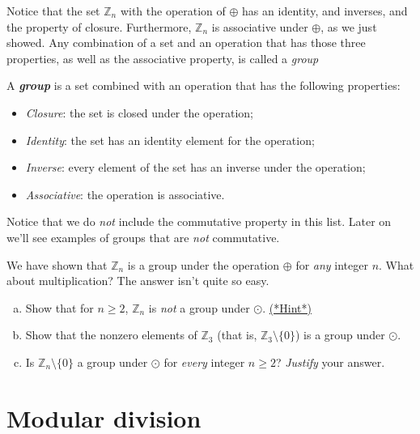 Notice that the set ${\mathbb Z}_n$ with the operation of $\oplus$ has an identity, and inverses, and the property of closure. Furthermore, ${\mathbb Z}_n$ is associative under $\oplus$, as we just showed.  Any combination of a set and an operation that has those three properties, as well as the associative property, is called a \emph{group}

\begin{defn} \label{definition:modular:group} A \textbf{\textit{group}} is a set combined with an operation that has the following properties:
\begin{itemize}
\item \emph{Closure}: the set is closed under the operation;
\item \emph{Identity}: the set has an identity element for the operation;
\item \emph{Inverse}: every element of the set has an inverse under the operation;
\item \emph{Associative}: the operation is associative.
\end{itemize}
\end{defn}

\noindent
Notice that we do  \emph{not} include the commutative property in this list. Later on we'll see examples of groups that are \emph{not} commutative. 

We have shown that  ${\mathbb Z}_n$ is a group under the operation $\oplus$ for \emph{any} integer $n$. What about multiplication? The answer isn't quite so easy.

\begin{exercise}{64}
\begin{enumerate}[(a)]
\item Show that for $n \ge 2$, ${\mathbb Z}_n$ is \emph{not} a group under $\odot$. 
\hyperref[sec:modular_arithmetic:hints]{(*Hint*)}
\item
Show that the nonzero elements of ${\mathbb Z}_3$ (that is, ${\mathbb Z}_3 \setminus \{0\}$)  is a group under $\odot$.
\item
Is ${\mathbb Z}_n \setminus \{0\}$ a group under $\odot$ for \emph{every} integer $n \ge 2$?  \emph{Justify} your answer.
\end{enumerate}
\end{exercise}


 \section{Modular division\quad
{}}\label{euclidean}

